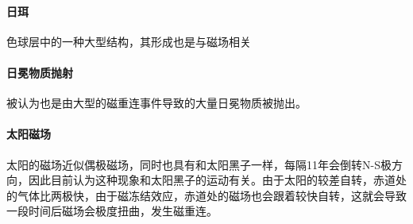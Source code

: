 \paragraph{日珥}
色球层中的一种大型结构，其形成也是与磁场相关

\paragraph{日冕物质抛射}
被认为也是由大型的磁重连事件导致的大量日冕物质被抛出。

\paragraph{太阳磁场}
太阳的磁场近似偶极磁场，同时也具有和太阳黑子一样，每隔11年会倒转N-S极方向，因此目前认为这种现象和太阳黑子的运动有关。由于太阳的较差自转，赤道处的气体比两极快，由于磁冻结效应，赤道处的磁场也会跟着较快自转，这就会导致一段时间后磁场会极度扭曲，发生磁重连。
